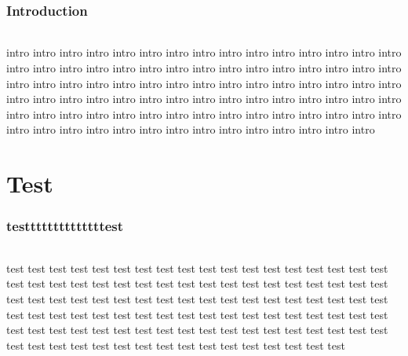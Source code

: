 \documentclass[titlepage, 13px, a4paper]{report}
\begin{document}
\AddToShipoutPicture*{\BackgroundPic}

\maketitle
\tableofcontents

\newpage 
\section{Introduction} 
\paragraph{} \hspace{0pt} 
intro intro intro intro intro intro intro intro intro intro intro intro intro intro intro intro intro intro intro intro intro intro intro intro intro intro intro intro intro intro intro intro intro intro intro intro intro intro intro intro intro intro intro intro intro intro intro intro intro intro intro intro intro intro intro intro intro intro intro intro intro intro intro intro intro intro intro intro intro intro intro intro intro intro intro intro intro intro intro intro intro intro intro intro intro intro intro intro intro 



\newpage




\part{Test}  
\section{testtttttttttttttest} 
\paragraph{} \hspace{0pt} 
test test test test test test test test test test test test test test test test test test test test test test test test test test test test test test test test test test test test test test test test test test test test test test test test test test test test test test test test test test test test test test test test test test test test test test test test test test test test test test test test test test test test test test test test test test test test test test test test test test test test test test test test test test 
\end{document}
